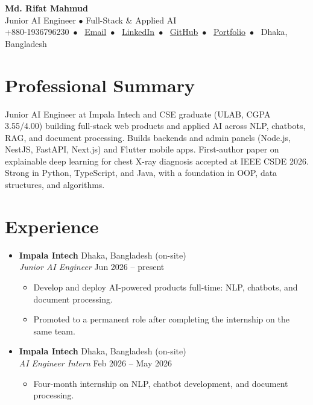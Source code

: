 \documentclass[letterpaper,11pt]{article}
\newcommand{\role}[4]{\item \textbf{#1} \hfill #2 \\ \textit{#3} \hfill #4}
\begin{document}
\begin{center}
    {\LARGE \textbf{Md. Rifat Mahmud}} \\[3pt]
    Junior AI Engineer $\bullet$ Full-Stack \& Applied AI \\[3pt]
    \small
    +880-1936796230~$\bullet$~
    \href{mailto:rifat.mahmud.cse@ulab.edu.bd}{Email}~$\bullet$~
    \href{https://www.linkedin.com/in/md-rifat-mahmud-446171341/}{LinkedIn}~$\bullet$~
    \href{https://github.com/rifat-mah-mud}{GitHub}~$\bullet$~
    \href{https://rifat-mah-mud.github.io/PortFolio/}{Portfolio}~$\bullet$~
    Dhaka, Bangladesh
\end{center}

\section{Professional Summary}
Junior AI Engineer at Impala Intech and CSE graduate (ULAB, CGPA 3.55/4.00) building full-stack web products and applied AI across NLP, chatbots, RAG, and document processing. Builds backends and admin panels (Node.js, NestJS, FastAPI, Next.js) and Flutter mobile apps. First-author paper on explainable deep learning for chest X-ray diagnosis accepted at IEEE CSDE 2026. Strong in Python, TypeScript, and Java, with a foundation in OOP, data structures, and algorithms.

\section{Experience}
\begin{itemize}
    \role{Impala Intech}{Dhaka, Bangladesh (on-site)}{Junior AI Engineer}{Jun 2026 -- present}
    \begin{itemize}
        \item Develop and deploy AI-powered products full-time: NLP, chatbots, and document processing.
        \item Promoted to a permanent role after completing the internship on the same team.
    \end{itemize}
    \role{Impala Intech}{Dhaka, Bangladesh (on-site)}{AI Engineer Intern}{Feb 2026 -- May 2026}
    \begin{itemize}
        \item Four-month internship on NLP, chatbot development, and document processing.
    \end{itemize}
\end{itemize}
\end{document}
